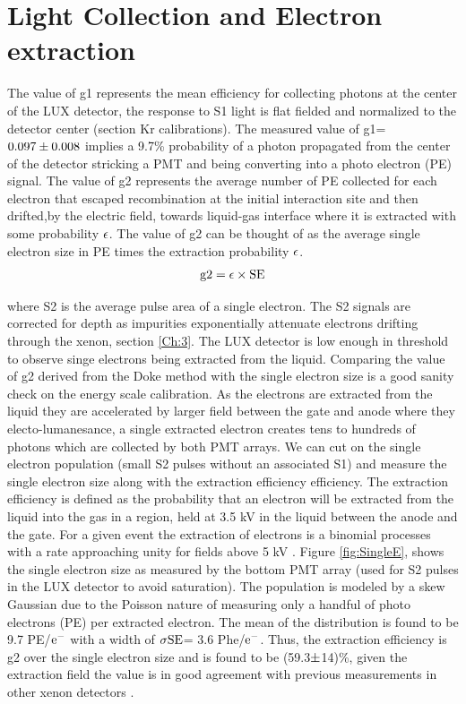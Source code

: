 \section{Light Collection and Electron extraction}

The value of g1 represents the mean efficiency for collecting photons at the center of the LUX detector, the response to S1 light is flat fielded and normalized to the detector center (section Kr calibrations). The measured value of g1= $\rm0.097\pm0.008$ implies a 9.7\% probability of a photon propagated from the center of the detector stricking a PMT and being converting into a photo electron (PE) signal. The value of g2 represents the average number of PE collected for each electron that escaped recombination at the initial interaction site and then drifted,by the electric field, towards liquid-gas interface where it is extracted with some probability $\rm \epsilon$. The value of g2 can be thought of as the average single electron size in PE times the extraction probability $\rm \epsilon$.
\begin{equation}
\rm g2=\epsilon \times SE
\end{equation}
 
 \noindent where S2 is the average pulse area of a single electron. The S2 signals are corrected for depth as impurities exponentially attenuate electrons drifting through the xenon, section \ref{Ch:3}. The LUX detector is low enough in threshold to observe singe electrons being extracted from the liquid. Comparing the value of g2 derived from the Doke method with the single electron size is a good sanity check on the energy scale calibration. As the electrons are extracted from the liquid they are accelerated by larger field between the gate and anode where they electo-lumanesance, a single extracted electron creates tens to hundreds of photons which are collected by both PMT arrays. We can cut on the single electron population (small S2 pulses without an associated S1) and measure the single electron size along with the extraction efficiency efficiency. The extraction efficiency is defined as the probability that an electron will be extracted from the liquid into the gas in a region, held at 3.5 kV in the liquid between the anode and the gate. For a given event the extraction of electrons is a binomial processes with a rate approaching unity for fields above 5 kV \cite{Recomb_Time_Extraction} \cite{Aprile_LXe_overview}. Figure \ref{fig:SingleE}, shows the single electron size as measured by the bottom PMT array (used for S2 pulses in the LUX detector to avoid saturation). The population is modeled by a skew Gaussian due to the Poisson nature of measuring only a handful of photo electrons (PE) per extracted electron. The mean of the distribution is found to be 9.7 PE/$\rm e^-$ with a width of $\rm \sigma SE$= 3.6 Phe/$\rm e^-$. Thus, the extraction efficiency is g2 over the single electron size and is found to be (59.3$\rm \pm$14)\%, given the extraction field the value is in good agreement with previous measurements in other xenon detectors \cite{Recomb_Time_Extraction} \cite{Aprile_LXe_overview}.

